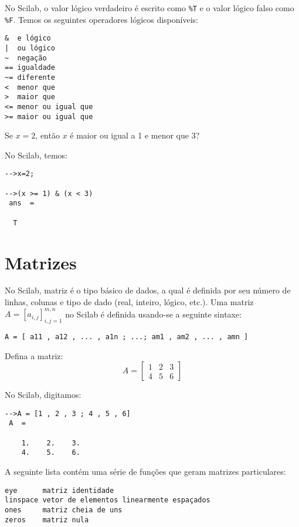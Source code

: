 No Scilab, o valor lógico verdadeiro é escrito como \verb+%T+ e o valor lógico falso como \verb+%F+. Temos os seguintes operadores lógicos disponíveis:
\begin{verbatim}
&  e lógico
|  ou lógico
~  negação
== igualdade
~= diferente
<  menor que
>  maior que
<= menor ou igual que
>= maior ou igual que
\end{verbatim}

\begin{ex}
  Se $x=2$, então $x$ é maior ou igual a 1 e menor que 3? 
\end{ex}
\begin{sol}
  No Scilab, temos:
\begin{verbatim}
-->x=2;
 
-->(x >= 1) & (x < 3)
 ans  =
 
  T  
\end{verbatim}
\end{sol}

\section{Matrizes}

No Scilab, matriz é o tipo básico de dados, a qual é definida por seu número de linhas, colunas e tipo de dado (real, inteiro, lógico, etc.). Uma matriz $A = [a_{i,j}]_{i,j=1}^{m,n}$ no Scilab é definida usando-se a seguinte sintaxe:
\begin{verbatim}
A = [ a11 , a12 , ... , a1n ; ...; am1 , am2 , ... , amn ]
\end{verbatim}

\begin{ex}
  Defina a matriz:
  \begin{equation}
    A = \left[
      \begin{array}{ccc}
        1 & 2 & 3\\
        4 & 5 & 6
      \end{array}
\right]
  \end{equation}
\end{ex}
\begin{sol}
  No Scilab, digitamos:
\begin{verbatim}
-->A = [1 , 2 , 3 ; 4 , 5 , 6]
 A  =
 
    1.    2.    3.  
    4.    5.    6.  
\end{verbatim}
\end{sol}

A seguinte lista contém uma série de funções que geram matrizes particulares:
\begin{verbatim}
eye      matriz identidade
linspace vetor de elementos linearmente espaçados
ones     matriz cheia de uns
zeros    matriz nula
\end{verbatim}

